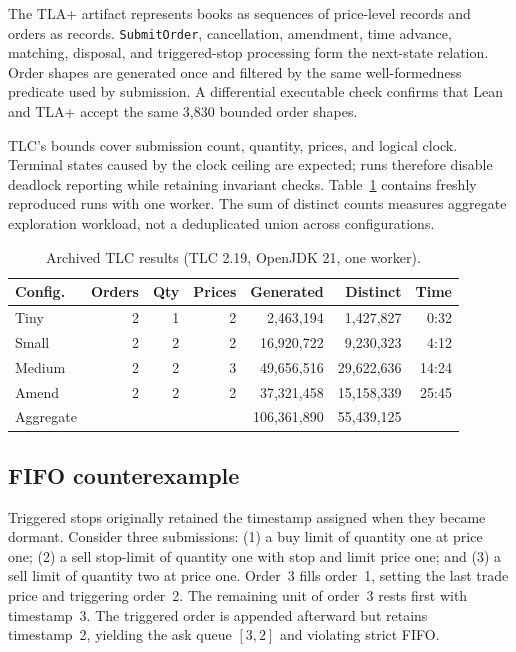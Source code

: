 \documentclass[runningheads]{llncs}
\begin{document}
The TLA+ artifact represents books as sequences of price-level records and
orders as records. \texttt{SubmitOrder}, cancellation, amendment, time
advance, matching, disposal, and triggered-stop processing form the next-state
relation. Order shapes are generated once and filtered by the same
well-formedness predicate used by submission. A differential executable check
confirms that Lean and TLA+ accept the same 3,830 bounded order shapes.

TLC's bounds cover submission count, quantity, prices, and logical clock.
Terminal states caused by the clock ceiling are expected; runs therefore
disable deadlock reporting while retaining invariant checks. Table~\ref{tab:tlc}
contains freshly reproduced runs with one worker. The sum of distinct counts
measures aggregate exploration workload, not a deduplicated union across
configurations.

\begin{table}[t]
\caption{Archived TLC results (TLC 2.19, OpenJDK 21, one worker).}
\label{tab:tlc}
\centering
\scriptsize
\begin{tabular}{@{}lrrrrrr@{}}
\toprule
Config. & Orders & Qty & Prices & Generated & Distinct & Time \\
\midrule
Tiny & 2 & 1 & 2 & 2,463,194 & 1,427,827 & 0:32 \\
Small & 2 & 2 & 2 & 16,920,722 & 9,230,323 & 4:12 \\
Medium & 2 & 2 & 3 & 49,656,516 & 29,622,636 & 14:24 \\
Amend & 2 & 2 & 2 & 37,321,458 & 15,158,339 & 25:45 \\
\midrule
Aggregate & & & & 106,361,890 & 55,439,125 & \\
\bottomrule
\end{tabular}
\end{table}

\subsection{FIFO counterexample}

Triggered stops originally retained the timestamp assigned when they became
dormant. Consider three submissions: (1) a buy limit of quantity one at price
one; (2) a sell stop-limit of quantity one with stop and limit price one; and
(3) a sell limit of quantity two at price one. Order~3 fills order~1, setting
the last trade price and triggering order~2. The remaining unit of order~3
rests first with timestamp~3. The triggered order is appended afterward but
retains timestamp~2, yielding the ask queue $[3,2]$ and violating strict FIFO.
\end{document}
